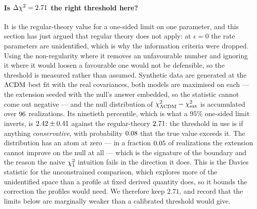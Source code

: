 \paragraph{Is $\Delta\chi^{2}=2.71$ the right threshold here?} It is the
regular-theory value for a one-sided limit on one parameter, and this section
has just argued that regular theory does not apply: at $\epsilon=0$ the rate
parameters are unidentified, which is why the information criteria were
dropped. Using the non-regularity where it removes an unfavourable number and
ignoring it where it would loosen a favourable one would not be defensible, so
the threshold is measured rather than assumed. Synthetic data are generated at
the $\Lambda\mathrm{CDM}$ best fit with the real covariances, both models are maximised on
each --- the extension seeded with the null's answer embedded, so the statistic
cannot come out negative --- and the null distribution of
$\chi^{2}_{\Lambda\mathrm{CDM}}-\chi^{2}_{\rm ext}$ is accumulated over
$96$ realizations. Its ninetieth percentile, which is what a
$95\%$ one-sided limit inverts, is
$2.42\pm0.41$ against the regular-theory
$2.71$: the threshold in use is if anything
\emph{conservative}, with probability
$0.08$ that the true value exceeds it. The
distribution has an atom at zero --- in a fraction
$0.05$ of realizations the extension cannot improve
on the null at all --- which is the signature of the boundary and the reason
the naive $\chi^{2}_1$ intuition fails in the direction it does. This is the
Davies statistic for the unconstrained comparison, which explores more of the
unidentified space than a profile at fixed derived quantity does, so it bounds
the correction the profiles would need. We therefore keep $2.71$, and record
that the limits below are marginally weaker than a calibrated threshold would
give.

